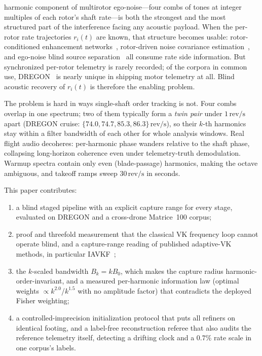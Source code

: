 \documentclass[journal]{IEEEtran}
\newcommand{\revps}{\ensuremath{\,\mathrm{rev/s}}}
\begin{document}
 harmonic component of multirotor ego-noise---four
combs of tones at integer multiples of each rotor's shaft rate---is both
the strongest and the most structured part of the interference facing any
acoustic payload. When the per-rotor rate trajectories $r_i(t)$ are known,
that structure becomes usable: rotor-conditioned enhancement
networks~\cite{gulli2025rotorcond,liu2025edgebsrof}, rotor-driven noise
covariance estimation~\cite{yen2023ncm}, and ego-noise blind source
separation~\cite{wang2020bss} all consume rate side information. But
synchronized per-rotor telemetry is rarely recorded; of the corpora in
common use, DREGON~\cite{strauss2018dregon} is nearly unique in shipping
motor telemetry at all. Blind acoustic recovery of $r_i(t)$ is therefore
the enabling problem.

The problem is hard in ways single-shaft order tracking is not. Four combs
overlap in one spectrum; two of them typically form a \emph{twin pair}
under $1\revps$ apart (DREGON cruise: $\{74.0, 74.7, 85.3,
86.3\}\revps$), so their $k$-th harmonics stay within a filter bandwidth
of each other for whole analysis windows. Real flight audio decoheres:
per-harmonic phase wanders relative to the shaft phase, collapsing
long-horizon coherence even under telemetry-truth demodulation. Warmup
spectra contain only even (blade-passage) harmonics, making the octave
ambiguous, and takeoff ramps sweep $30\revps$ in seconds.

This paper contributes:
\begin{enumerate}
\item a blind staged pipeline with an explicit capture range for every
  stage, evaluated on DREGON and a cross-drone Matrice~100 corpus;
\item proof and threefold measurement that the classical VK frequency
  loop cannot operate blind, and a capture-range reading of published
  adaptive-VK methods, in particular IAVKF~\cite{jiang2024iavkf};
\item the $k$-scaled bandwidth $B_k = kB_0$, which makes the capture
  radius harmonic-order-invariant, and a measured per-harmonic
  information law (optimal weights $\propto k^{2.0}$/$k^{1.5}$ with no
  amplitude factor) that contradicts the deployed Fisher weighting;
\item a controlled-imprecision initialization protocol that puts all
  refiners on identical footing, and a label-free reconstruction referee
  that also audits the reference telemetry itself, detecting a drifting
  clock and a $0.7\%$ rate scale in one corpus's labels.
\end{enumerate}
\end{document}
